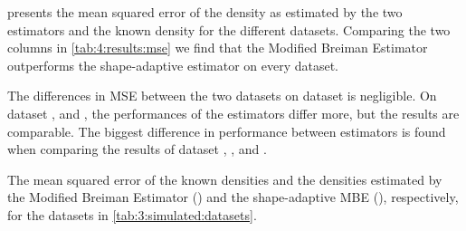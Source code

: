 
 presents the mean squared error of the density as estimated by the two estimators and the known density for the different datasets. Comparing the two columns in \cref{tab:4:results:mse} we find that the Modified Breiman Estimator outperforms the shape-adaptive estimator on every dataset. 

The differences in MSE between the two datasets on dataset \ferdosiOne is negligible. On dataset \ferdosiTwo, and \ferdosiFive, the performances of the estimators differ more, but the results are comparable. The biggest difference in performance between estimators is found when comparing the results of dataset \baakmanOne, \baakmanFour, and \baakmanFive.

\begin{table}
	\centering
	
	\caption{The mean squared error of the known densities and the densities estimated by the Modified Breiman Estimator (\mbe) and the shape-adaptive MBE (\sambe), respectively, for the datasets in \cref{tab:3:simulated:datasets}.} 	
	\label{tab:4:results:mse}
\end{table}